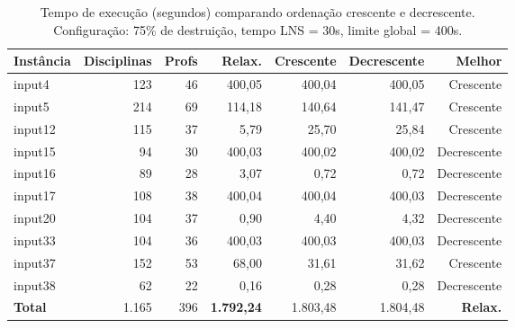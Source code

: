 \begin{table}[htbp]
\centering
\caption{Tempo de execução (segundos) comparando ordenação crescente e decrescente. Configuração: 75\% de destruição, tempo LNS = 30s, limite global = 400s.}
\label{tab:lns_order_tempo}
\small
\begin{tabular}{@{}lrrrrrr@{}}
\toprule
\textbf{Instância} & \textbf{Disciplinas} & \textbf{Profs} & \textbf{Relax.} & \textbf{Crescente} & \textbf{Decrescente} & \textbf{Melhor} \\
\midrule
input4  & 123 & 46 & 400,05 & 400,04 & 400,05 & Crescente \\
input5  & 214 & 69 & 114,18 & 140,64 & 141,47 & Crescente \\
input12 & 115 & 37 & 5,79   & 25,70  & 25,84  & Crescente \\
input15 & 94  & 30 & 400,03 & 400,02 & 400,02 & Decrescente \\
input16 & 89  & 28 & 3,07   & 0,72   & 0,72   & Decrescente \\
input17 & 108 & 38 & 400,04 & 400,04 & 400,03 & Decrescente \\
input20 & 104 & 37 & 0,90   & 4,40   & 4,32   & Decrescente \\
input33 & 104 & 36 & 400,03 & 400,03 & 400,03 & Decrescente \\
input37 & 152 & 53 & 68,00  & 31,61  & 31,62  & Crescente \\
input38 & 62  & 22 & 0,16   & 0,28   & 0,28   & Decrescente \\
\midrule
\textbf{Total}  & 1.165 & 396 & \textbf{1.792,24} & 1.803,48 & 1.804,48 & \textbf{Relax.} \\
\bottomrule
\end{tabular}
\end{table}

